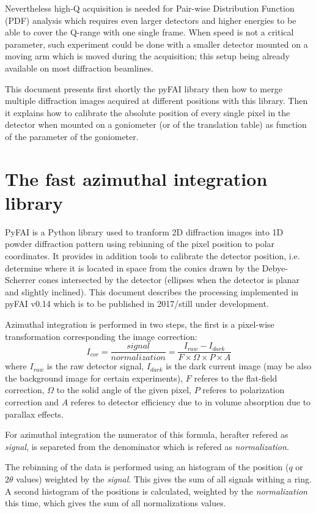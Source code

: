 \documentclass{iucr}              %
\begin{document}
Nevertheless high-Q acquisition is needed for Pair-wise Distribution Function
(PDF) analysis which requires even larger detectors and higher energies to be
able to cover the Q-range with one single frame.
When speed is not a critical parameter, such experiment could be done with a
smaller detector mounted on a moving arm which is moved during the
acquisition; this setup being already available on most diffraction beamlines.

This document presents first shortly the pyFAI library\cite{} then how to merge
multiple diffraction images acquired at different positions with this
library\cite{}. 
Then it explains how to calibrate the absolute position of every single
pixel in the detector when mounted on a goniometer (or of the translation table)
as function of the parameter of the goniometer. 

\section{The fast azimuthal integration library}

PyFAI is a Python library used to tranform 2D diffraction images into 1D powder
diffraction pattern using rebinning of the pixel position to polar coordinates.
It provides in addition tools to calibrate the detector position, i.e. determine
where it is located in space from the conics drawn by the Debye-Scherrer cones
intersected by the detector (ellipses when the detector is planar and slightly
inclined). This document describes the processing implemented in pyFAI
v0.14 which is to be published in 2017/still under development.

Azimuthal integration is performed in two steps, the first is a pixel-wise
transformation corresponding the image correction:
$$
I_{cor} = \frac{signal}{normalization}  = \frac{I_{raw} - I_{dark}}{F \times
\Omega \times P \times A } $$
where $I_{raw}$ is the raw detector signal, $I_{dark}$ is the dark current
image (may be also the background image for certain experiments), $F$ referes to
the flat-field correction, $\Omega$ to the solid angle of the given pixel, $P$
referes to polarization correction and $A$ referes to detector efficiency due
to in volume absorption due to parallax effects.

For azimuthal integration the numerator of this formula, herafter refered as
\textit{signal}, is separeted from the denominator which is refered as
\textit{normalization}.

The rebinning of the data is performed using an histogram of the position ($q$
or $2\theta$ values) weighted by the \textit{signal}.
This gives the sum of all signals withing a ring.
A second histogram of the positions is calculated, weighted by the
\textit{normalization} this time, which gives the sum of all normalizations
values.
\end{document}
